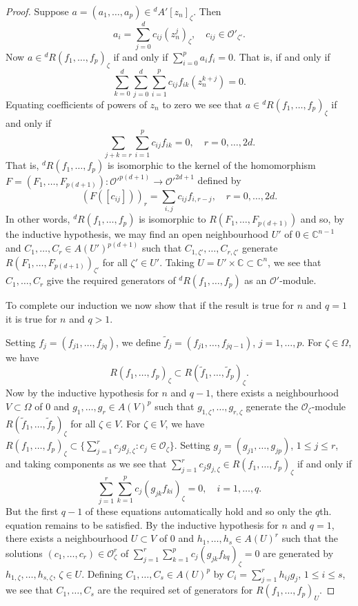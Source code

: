 \begin{proof}
Suppose $a=(a_1,\ldots,a_p)\in{}^d A'[z_n]_\zeta$. Then
\[
a_i=\sum_{j=0}^d c_{ij}(z_n^j)_\zeta,\quad c_{ij}\in\mathcal{O}'_{\zeta'}.
\]
Now $a\in{}^d R(f_1,\ldots,f_p)_\zeta$ if and only if $\sum_{i=0}^p a_if_i=0$. That is, if and only if
\[
\sum_{k=0}^d\sum_{j=0}^d\sum_{i=1}^p c_{ij}f_{ik}(z_n^{k+j})=0.
\]
Equating coefficients of powers of $z_n$ to zero we see that $a\in{}^d R(f_1,\ldots,f_p)_\zeta$ if and only if
\[
\sum_{j+k=r}\sum_{i=1}^p c_{ij}f_{ik}=0,\quad r=0,\ldots,2d.
\]
That is, ${}^d R(f_1,\ldots,f_p)$ is isomorphic to the kernel of the homomorphism $F=(F_1,\ldots,F_{p(d+1)}):\mathcal{O}'^{p(d+1)}\to\mathcal{O}'^{2d+1}$ defined by
\[
(F([c_{ij}]))_r=\sum_{i,j}c_{ij}f_{i,r-j},\quad r=0,\ldots,2d.
\]
In other words, ${}^d R(f_1,\ldots,f_p)$ is isomorphic to $R(F_1,\ldots,F_{p(d+1)})$ and so, by the inductive hypothesis, we may find an open neighbourhood $U'$ of $0\in\mathbb{C}^{n-1}$ and $C_1,\ldots,C_r\in A(U')^{p(d+1)}$ such that $C_{1,\zeta'},\ldots,C_{r,\zeta'}$ generate $R(F_1,\ldots,F_{p(d+1)})_{\zeta'}$ for all $\zeta'\in U'$. Taking $U=U'\times\mathbb{C}\subset\mathbb{C}^n$, we see that $C_1,\ldots,C_r$ give the required generators of ${}^d R(f_1,\ldots,f_p)$ as an $\mathcal{O}'$-module.

To complete our induction we now show that if the result is true for $n$ and $q=1$ it is true for $n$ and $q>1$.

Setting $f_j=(f_{j1},\ldots,f_{jq})$, we define $\widetilde f_j=(f_{j1},\ldots,f_{jq-1})$, $j=1,\ldots,p$. For $\zeta\in\Omega$, we have
\[
R(f_1,\ldots,f_p)_\zeta\subset R(\widetilde f_1,\ldots,\widetilde f_p)_\zeta.
\]
Now by the inductive hypothesis for $n$ and $q-1$, there exists a neighbourhood $V\subset\Omega$ of 0 and $g_1,\ldots,g_r\in A(V)^p$ such that $g_{1,\zeta},\ldots,g_{r,\zeta}$ generate the $\mathcal{O}_\zeta$-module $R(\widetilde f_1,\ldots,\widetilde f_p)_\zeta$ for all $\zeta\in V$. For $\zeta\in V$, we have $R(f_1,\ldots,f_p)_\zeta\subset\{\sum_{j=1}^r c_jg_{j,\zeta}:c_j\in\mathcal{O}_\zeta\}$. Setting $g_j=(g_{j1},\ldots,g_{jp})$, $1\leq j\leq r$, and taking components as we see that $\sum_{j=1}^r c_jg_{j,\zeta}\in R(f_1,\ldots,f_p)_\zeta$ if and only if
\[
\sum_{j=1}^r\sum_{k=1}^p c_j(g_{jk}f_{ki})_\zeta=0,\quad i=1,\ldots,q.
\]
But the first $q-1$ of these equations automatically hold and so only the $q$th. equation remains to be satisfied. By the inductive hypothesis for $n$ and $q=1$, there exists a neighbourhood $U\subset V$ of 0 and $h_1,\ldots,h_s\in A(U)^r$ such that the solutions $(c_1,\ldots,c_r)\in\mathcal{O}_\zeta^r$ of $\sum_{j=1}^r\sum_{k=1}^p c_j(g_{jk}f_{kq})_\zeta=0$ are generated by $h_{1,\zeta},\ldots,h_{s,\zeta}$, $\zeta\in U$. Defining $C_1,\ldots,C_s\in A(U)^p$ by $C_i=\sum_{j=1}^r h_{ij}g_j$, $1\leq i\leq s$, we see that $C_1,\ldots,C_s$ are the required set of generators for $R(f_1,\ldots,f_p)_U$.
\end{proof}
